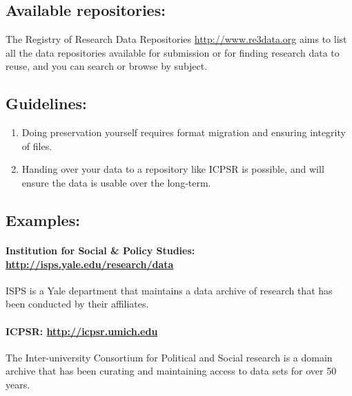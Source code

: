 \subsection{Available repositories:}\label{available-repositories}

The Registry of Research Data Repositories \url{http://www.re3data.org}
aims to list all the data repositories available for submission or for
finding research data to reuse, and you can search or browse by subject.

\subsection{Guidelines:}\label{guidelines}

\begin{enumerate}
\def\labelenumi{\arabic{enumi}.}
\tightlist
\item
  Doing preservation yourself requires format migration and ensuring
  integrity of files.
\item
  Handing over your data to a repository like ICPSR is possible, and
  will ensure the data is usable over the long-term.
\end{enumerate}

\subsection{Examples:}\label{examples}

\paragraph{\texorpdfstring{Institution for Social \& Policy Studies:
\url{http://isps.yale.edu/research/data}}{Institution for Social \& Policy Studies: http://isps.yale.edu/research/data}}\label{institution-for-social-policy-studies-httpisps.yale.eduresearchdata}

ISPS is a Yale department that maintains a data archive of research that
has been conducted by their affiliates.

\paragraph{\texorpdfstring{ICPSR:
\url{http://icpsr.umich.edu}}{ICPSR: http://icpsr.umich.edu}}\label{icpsr-httpicpsr.umich.edu}

The Inter-university Consortium for Political and Social research is a
domain archive that has been curating and maintaining access to data
sets for over 50 years.

